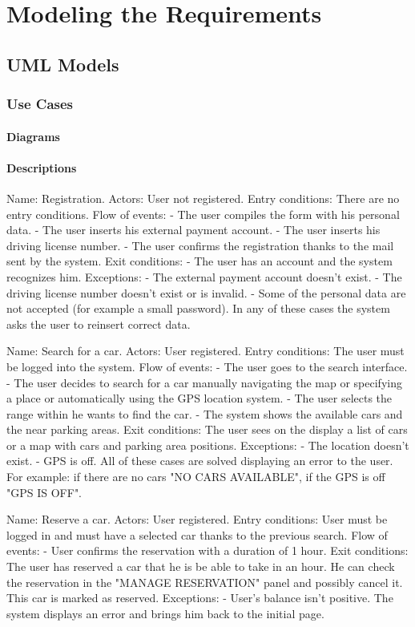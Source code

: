 \documentclass[11pt,a4paper]{report}
\begin{document}
\chapter{Modeling the Requirements}

\section{UML Models}
\subsection{Use Cases}
\subsubsection{Diagrams}
\subsubsection{Descriptions}
Name: Registration.
Actors: User not registered.
Entry conditions: There are no entry conditions.
Flow of events:
- The user compiles the form with his personal data.
- The user inserts his external payment account.
- The user inserts his driving license number.
- The user confirms the registration thanks to the mail sent by the system.
Exit conditions:
- The user has an account and the system recognizes him.
Exceptions:
- The external payment account doesn't exist.
- The driving license number doesn't exist or is invalid.
- Some of the personal data are not accepted (for example a small password).
In any of these cases the system asks the user to reinsert correct data.


Name: Search for a car.
Actors: User registered.
Entry conditions: The user must be logged into the system.
Flow of events:
- The user goes to the search interface.
- The user decides to search for a car manually navigating the map or specifying a place or automatically using the GPS location system.
- The user selects the range within he wants to find the car.
- The system shows the available cars and the near parking areas.
Exit conditions: The user sees on the display a list of cars or a map with cars and parking area positions.
Exceptions:
- The location doesn't exist.
- GPS is off.
All of these cases are solved displaying an error to the user. 
For example: if there are no cars "NO CARS AVAILABLE", if the GPS is off "GPS IS OFF".


Name: Reserve a car.
Actors: User registered.
Entry conditions: User must be logged in and must have a selected car  thanks to the previous search.
Flow of events:
- User confirms the reservation with a duration of 1 hour.
Exit conditions: The user has reserved a car that he is be able to take in an hour. He can check the reservation in the "MANAGE RESERVATION" panel and possibly cancel it. This car is marked as reserved.
Exceptions:
- User's balance isn't positive.
The system displays an error and brings him back to the initial page.
\end{document}
